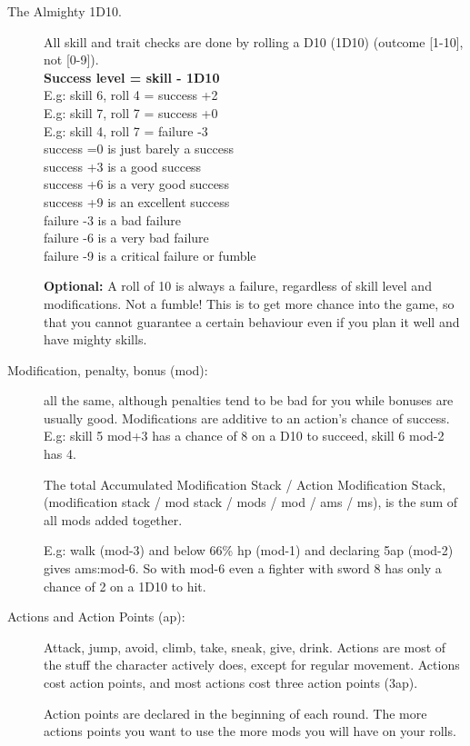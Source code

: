 \begin{description}


\item[The Almighty 1D10.] 
All skill and trait checks are done by rolling a D10 (1D10) (outcome [1-10], not [0-9]).\\
\textbf{Success level = skill - 1D10} \\
E.g: skill 6, roll 4 = success +2 \\
E.g: skill 7, roll 7 = success +0 \\
E.g: skill 4, roll 7 = failure -3 \\
success =0 is just barely a success \\
success +3 is a good success \\
success +6 is a very good success \\
success +9 is an excellent success \\
failure -3 is a bad failure \\
failure -6 is a very bad failure \\
failure -9 is a critical failure or fumble

\textbf{Optional:} A roll of 10 is always a failure, regardless of skill level and modifications. Not a fumble! This is to get more chance into the game, so that you cannot guarantee a certain behaviour even if you plan it well and have mighty skills.


\item[Modification, penalty, bonus (mod):] 
all the same, although penalties tend to be bad for you while bonuses are usually good. Modifications are additive to an action's chance of success. \\
E.g: skill 5 mod+3 has a chance of 8 on a D10 to succeed, skill 6 mod-2 has 4.

The total Accumulated Modification Stack / Action Modification Stack, (modification stack / mod stack / mods / mod / ams / ms), is the sum of all mods added together.

E.g: walk (mod-3) and below 66\% hp (mod-1) and declaring 5ap (mod-2) gives ams:mod-6. So with mod-6 even a fighter with sword 8 has only a chance of 2 on a 1D10 to hit.


\item[Actions and Action Points (ap):]
Attack, jump, avoid, climb, take, sneak, give, drink. 
Actions are most of the stuff the character actively does, except for regular movement. Actions cost action points, and most actions cost three action points (3ap).

Action points are declared in the beginning of each round. The more actions points you want to use the more mods you will have on your rolls.


\end{description}
